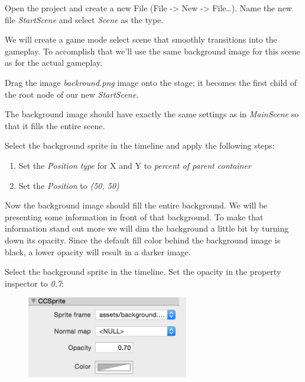 \begin{leftbar}
Open the \SB{} project and create a new File (File -> New -> File\ldots). Name
the new file \textit{StartScene} and select \textit{Scene} as the type.
\end{leftbar}

We will create a game mode select scene that smoothly transitions into the
gameplay. To accomplish that we'll use the same background image for this scene
as for the actual gameplay. 

\begin{leftbar}
Drag the image \textit{backround.png} image onto the stage; it becomes the first
child of the root node of our new \textit{StartScene}.
\end{leftbar}

The background image should have exactly the same settings as in
\textit{MainScene} so that it fills the entire scene.

\begin{leftbar}
Select the background sprite in the timeline and apply the following steps:
\begin{enumerate}
  \item Set the \textit{Position type} for X and Y to \textit{percent of parent
  container}
  \item Set the \textit{Position} to \textit{(50, 50)}
\end{enumerate}
\end{leftbar}

Now the background image should fill the entire background. We will be
presenting some information in front of that background. To make that
information stand out more we will dim the background a little bit by turning
down its opacity. Since the default fill color behind the background image is
black, a lower opacity will result in a darker image.

\begin{leftbar}
Select the background sprite in the timeline. Set the opacity in the property
inspector to \textit{0.7}:
\begin{figure}[H]
		\centering
		\includegraphics[width=200pt]{images/Chapter6/opacity_lower.png}
\end{figure}
\end{leftbar}

